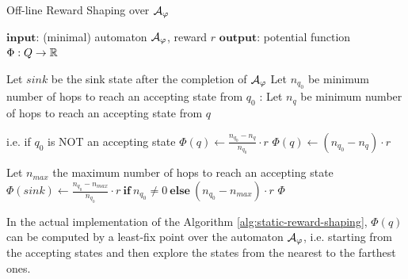 \begin{algorithm}
	\caption{Off-line Reward Shaping over $\mathcal{A}_{\varphi}$}
	\label{alg:static-reward-shaping}
	\begin{algorithmic}[1]
		\State $\mathbf{input}$: (minimal) automaton $\mathcal{A}_\varphi$, reward $r$
		\State $\mathbf{output}$: potential function $\Phi: Q\to \mathbb{R}$
		
		\State Let $sink$ be the sink state after the completion of $\mathcal{A}_{\varphi}$
		\State Let $n_{q_0}$ be minimum number of hops to reach an accepting state from $q_0$ \label{alg-line:q0-distance}
		:
			\State Let $n_q$ be minimum number of hops to reach an accepting state from $q$ \label{alg-line:q-distance}
			
			 \Comment i.e. if $q_0$ is NOT an accepting state
				\State $\Phi(q) \gets \frac{n_{q_0} - n_q}{n_{q_0}} \cdot r$
			\Else	
				\State $\Phi(q) \gets (n_{q_0} - n_q) \cdot r$
			\EndIf

		\EndFor
		
		\State Let $n_{max}$ the maximum number of hops  to reach an accepting state \label{alg-line:max-distance}
		\State $\Phi(sink) \gets \frac{n_{q_0} - n_{max}}{n_{q_0}} \cdot r \ \mathbf{if}\  n_{q_0}\neq 0 \ \mathbf{else}\  (n_{q_0} - n_{max}) \cdot r$ 
		\State \Return $\Phi$
 	\end{algorithmic}

\end{algorithm}

In the actual implementation of the Algorithm \ref{alg:static-reward-shaping}, $\Phi(q)$ can be computed by a least-fix point over the automaton $\mathcal{A}_\varphi$, i.e. starting from the accepting states and then explore the states from the nearest to the farthest ones.

